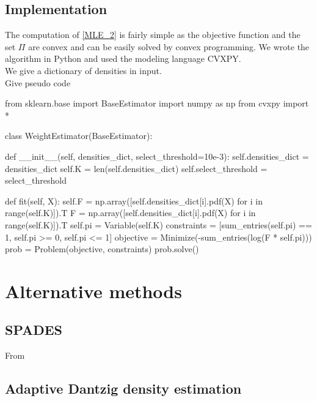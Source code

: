 \subsection{Implementation}
The computation of \cref{MLE_2} is fairly simple as the objective function and the set $\Pi$ are convex and can be easily solved by convex programming. We wrote the algorithm in Python and used the modeling language CVXPY\cite{cvxpy}.\\
We give a dictionary of densities in input.\\
Give pseudo code
\begin{python}
from sklearn.base import BaseEstimator
import numpy as np
from cvxpy import *


class WeightEstimator(BaseEstimator):

    def __init__(self, densities_dict, select_threshold=10e-3):
        self.densities_dict  = densities_dict
        self.K = len(self.densities_dict)
        self.select_threshold = select_threshold

    def fit(self, X):
        self.F = np.array([self.densities_dict[i].pdf(X) for i in range(self.K)]).T
        F = np.array([self.densities_dict[i].pdf(X) for i in range(self.K)]).T
        self.pi = Variable(self.K)
        constraints = [sum_entries(self.pi) == 1, self.pi >= 0, self.pi <= 1]
        objective = Minimize(-sum_entries(log(F * self.pi)))
        prob = Problem(objective, constraints)
        prob.solve()
\end{python}

\section{Alternative methods}
\subsection{SPADES}
From \cite{SPADES}
\subsection{Adaptive Dantzig density estimation}

